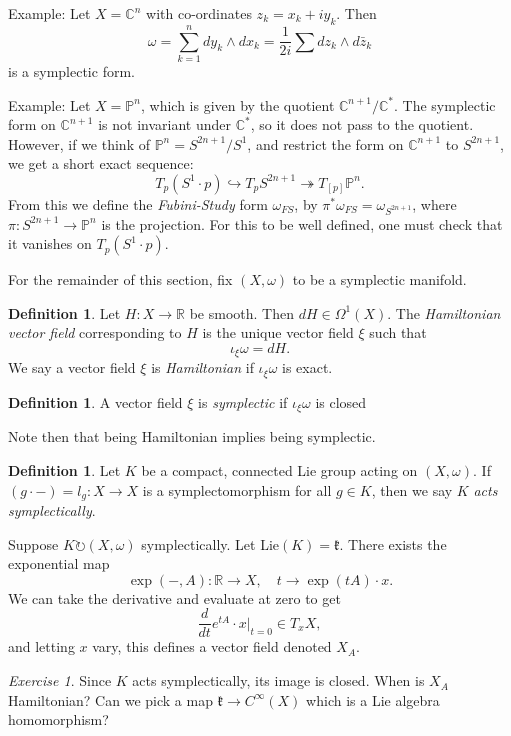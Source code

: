 \documentclass{article}
\theoremstyle{definition}
\newtheorem{definition}[theorem]{Definition}
\theoremstyle{remark}
\newtheorem{exercise}[theorem]{Exercise}
\numberwithin{theorem}{section}
\newcommand{\C}{\mathbb{C}}
\newcommand{\bP}{\mathbb{P}}
\newcommand{\fk}{\mathfrak{k}}
\newenvironment{defn}{
	\begin{mdframed}
		\vspace{-0.5em}
		\begin{definition}
		}{
		\end{definition}
	\end{mdframed}
}
\begin{document}
		\noindent Example: Let $X=\C^n$ with co-ordinates $z_k=x_k+iy_k$. Then
		$$\omega = \sum_{k=1}^n dy_k\wedge dx_k = \frac{1}{2i}\sum dz_k\wedge d\bar{z}_k$$
		is a symplectic form. \vspace{1em}
		
		\noindent Example: Let $X=\bP^n$, which is given by the quotient $\C^{n+1}/\C^\ast$. The symplectic form on $\C^{n+1}$ is not invariant under $\C^\ast$, so it does not pass to the quotient. However, if we think of $\bP^n = S^{2n+1}/S^1$, and restrict the form on $\C^{n+1}$ to $S^{2n+1}$, we get a short exact sequence:
		\begin{equation}
			T_p(S^1 \cdot p) \hookrightarrow T_pS^{2n+1}\twoheadrightarrow T_{[p]}\bP^n.
		\end{equation}
		From this we define the \emph{Fubini-Study} form $\omega_{FS}$, by $\pi^\ast \omega_{FS} = \omega_{S^{2n+1}}$, where $\pi:S^{2n+1}\to\bP^n$ is the projection. For this to be well defined, one must check that it vanishes on $T_p(S^1\cdot p)$. \vspace{1em}
		
		For the remainder of this section, fix $(X,\omega)$ to be a symplectic manifold.
		\begin{defn}
			Let $H:X\to \mathbb{R}$ be smooth. Then $dH\in \Omega^{1}(X)$. The \emph{Hamiltonian vector field} corresponding to $H$ is the unique vector field $\xi$ such that 
			\begin{equation}
				\iota_\xi \omega = dH.
			\end{equation}
			We say a vector field $\xi$ is \emph{Hamiltonian} if $\iota_\xi\omega$ is exact.
		\end{defn}
		\begin{defn}
			A vector field $\xi$ is \emph{symplectic} if $\iota_\xi\omega$ is closed
		\end{defn}
		Note then that being Hamiltonian implies being symplectic.
		\begin{defn}
			Let $K$ be a compact, connected Lie group acting on $(X,\omega)$. If $(g\cdot -) = l_g:X\to X$ is a symplectomorphism for all $g\in K$, then we say $K$ \emph{acts symplectically}. 
		\end{defn}
		Suppose $K\circlearrowright (X,\omega)$ symplectically. Let Lie$(K) = \fk$. There exists the exponential map
		\begin{equation}
			\exp(-,A):\mathbb{R} \to X, \quad t\to \exp(tA)\cdot x.
		\end{equation}
		We can take the derivative and evaluate at zero to get
		\begin{equation}
			\frac{d}{dt}e^{tA}\cdot x|_{t=0} \in T_xX,
		\end{equation}
		and letting $x$ vary, this defines a vector field denoted $X_A$.	
		\begin{exercise}
			Since $K$ acts symplectically, its image is closed. When is $X_A$ Hamiltonian? Can we pick a map 
			$\fk \to C^\infty(X)$ which is a Lie algebra homomorphism?
		\end{exercise}
		
\end{document}

